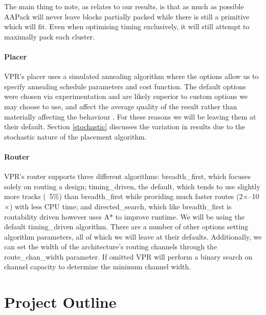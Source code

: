 \documentclass[12pt,final,oneside]{dwThesis} %
\begin{document}
   The main thing to
   note, as relates to our results, is that as much as possible AAPack will
   never leave blocks partially packed while there is still a primitive
   which will fit. Even when optimising timing exclusively, it will still
   attempt to maximally pack each cluster.

   \subsubsection{Placer} \gls{VPR}'s placer uses a simulated annealing
   algorithm where the options allow us to specify annealing schedule
   parameters and cost function. The default options were chosen via
   experimentation and are likely superior to custom options we may choose to
   use, and affect the average quality of the result rather than materially
   affecting the behaviour \cite{VPRManual, VPRBook}. For these reasons we will
   be leaving them at their default. Section \ref{stochastic} discusses the
   variation in results due to the stochastic nature of the placement
   algorithm.
   \subsubsection{Router} \gls{VPR}'s router supports three
   different algorithms: breadth\_first, which
   focuses solely on routing a design; timing\_driven, the default, which tends
   to use slightly more tracks (~5\%) than breadth\_first while providing much
   faster routes (2$\times$--10$\times$) with less CPU time; and
   directed\_search, which like breadth\_first is routability driven however
   uses A* to improve runtime. We will be using the default timing\_driven
   algorithm. There are a number of other options setting
   algorithm parameters, all of which we will leave at their defaults.
   Additionally, we can set the width of the architecture's routing channels through the
   route\_chan\_width parameter.
   If omitted \gls{VPR} will perform a binary search on channel capacity to
   determine the minimum channel width.


   \chapter{Project Outline}
\end{document}
